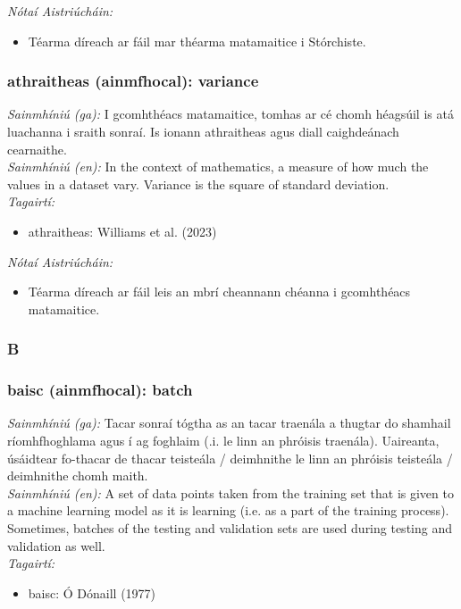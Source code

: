  \noindent \textit{Nótaí Aistriúcháin:}
\begin{itemize}
	\item Téarma díreach ar fáil mar théarma matamaitice i Stórchiste.
\end{itemize}


\subsubsection*{athraitheas (ainmfhocal): variance}
 \noindent \textit{Sainmhíniú (ga):} I gcomhthéacs matamaitice, tomhas ar cé chomh héagsúil is atá luachanna i sraith sonraí. Is ionann athraitheas agus diall caighdeánach cearnaithe.
\\
 \noindent \textit{Sainmhíniú (en):} In the context of mathematics, a measure of how much the values in a dataset vary. Variance is the square of standard deviation.
\\
 \noindent \textit{Tagairtí:}
\begin{itemize}
	\item athraitheas: Williams et al. (2023) \cite{storchiste}
\end{itemize}

 \noindent \textit{Nótaí Aistriúcháin:}
\begin{itemize}
	\item Téarma díreach ar fáil leis an mbrí cheannann chéanna i gcomhthéacs matamaitice.
\end{itemize}


 \subsubsection*{B}

\subsubsection*{baisc (ainmfhocal): batch}
 \noindent \textit{Sainmhíniú (ga):} Tacar sonraí tógtha as an tacar traenála a thugtar do shamhail ríomhfhoghlama agus í ag foghlaim (.i. le linn an phróisis traenála). Uaireanta, úsáidtear fo-thacar de thacar teisteála / deimhnithe le linn an phróisis teisteála / deimhnithe chomh maith.
\\
 \noindent \textit{Sainmhíniú (en):} A set of data points taken from the training set that is given to a machine learning model as it is learning (i.e. as a part of the training process). Sometimes, batches of the testing and validation sets are used during testing and validation as well.
\\
 \noindent \textit{Tagairtí:}
\begin{itemize}
	\item baisc: Ó Dónaill (1977) \cite{odonaill}
\end{itemize}

